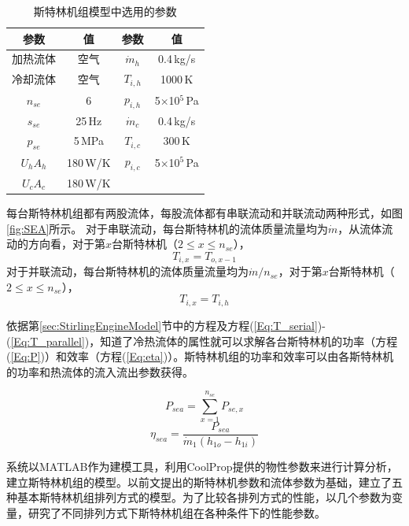 \begin{table}[htbp]
	\caption{斯特林机组模型中选用的参数}
	\begin{center}
	\begin{tabular}{cccc}
		\toprule
		参数		&	值	& 参数	&	值\\
		\midrule
		加热流体	&	空气		&	$\dot{m}_h$	&	0.4\,kg/s\\
		冷却流体	&	空气	&	$T_{i,h}$	&	1000\,K\\
		$n_{se}$	&	6	&	$p_{i,h}$	&	5$\times$10$^5$\,Pa\\
		$s_{se}$	&	25\,Hz	&	$\dot{m}_c$	&	0.4\,kg/s\\
		$p_{se}$		&	5\,MPa	&	$T_{i,c}$	&	300\,K\\
		$U_hA_h$	&	180\,W/K	&	$p_{i,c}$	&	5$\times$10$^5$\,Pa\\
		$U_cA_c$		&	180\,W/K	&&\\
		\bottomrule
	\end{tabular}
	\end{center}
	\label{tab:parameters}
\end{table}

每台斯特林机组都有两股流体，每股流体都有串联流动和并联流动两种形式，如图\ref{fig:SEA}所示。
对于串联流动，每台斯特林机的流体质量流量均为$\dot{m}$，从流体流动的方向看，对于第$x$台斯特林机（$2\leqslant{}x\leqslant{}n_{se}$），
\begin{equation}
	T_{i,x} = T_{o,x-1}
	\label{Eq:T_serial}
\end{equation}
对于并联流动，每台斯特林机的流体质量流量均为$\dot{m}/n_{se}$，对于第$x$台斯特林机（$2\leqslant{}x\leqslant{}n_{se}$），
\begin{equation}
	T_{i,x} = T_{i,h}
	\label{Eq:T_parallel}
\end{equation}

依据第\ref{sec:StirlingEngineModel}节中的方程及方程(\ref{Eq:T_serial})-(\ref{Eq:T_parallel})，知道了冷热流体的属性就可以求解各台斯特林机的功率（方程(\ref{Eq:P})）和效率（方程(\ref{Eq:eta})）。斯特林机组的功率和效率可以由各斯特林机的功率和热流体的流入流出参数获得。

\begin{equation}
	P_{sea} = \sum_{x = 1}^{n_{se}}P_{se,x}
\end{equation}
\begin{equation}
	\eta_{sea} = \dfrac{P_{sea}}{\dot{m}_1(h_{1o} - h_{1i})}
\end{equation}

系统以MATLAB作为建模工具，利用CoolProp提供的物性参数来进行计算分析，建立斯特林机组的模型。以前文提出的斯特林机参数和流体参数为基础，建立了五种基本斯特林机组排列方式的模型。为了比较各排列方式的性能，以几个参数为变量，研究了不同排列方式下斯特林机组在各种条件下的性能参数。


